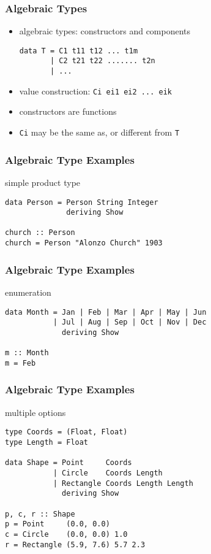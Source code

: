 \documentclass[dvipsnames]{beamer}
\theoremstyle{plain}
\begin{document}
\begin{frame}[fragile]
  \frametitle{Algebraic Types}

  \begin{itemize}
    \item \alert{algebraic types}: constructors and components
    \begin{lstlisting}[style=syntax]
data T = C1 t11 t12 ... t1m
       | C2 t21 t22 ....... t2n
       | ...
    \end{lstlisting}
    \item value construction: \lstinline|Ci ei1 ei2 ... eik|
    \item constructors are functions
    \item \lstinline|Ci| may be the same as, or different from \lstinline|T|
  \end{itemize}
\end{frame}

\begin{frame}[fragile]
  \frametitle{Algebraic Type Examples}

  \begin{exampleblock}{simple product type}
    \begin{lstlisting}
data Person = Person String Integer
              deriving Show

church :: Person
church = Person "Alonzo Church" 1903
    \end{lstlisting}
  \end{exampleblock}
\end{frame}

\begin{frame}[fragile]
  \frametitle{Algebraic Type Examples}

  \begin{exampleblock}{enumeration}
    \begin{lstlisting}
data Month = Jan | Feb | Mar | Apr | May | Jun
           | Jul | Aug | Sep | Oct | Nov | Dec
             deriving Show

m :: Month
m = Feb
    \end{lstlisting}
  \end{exampleblock}
\end{frame}

\begin{frame}[fragile]
  \frametitle{Algebraic Type Examples}

  \begin{exampleblock}{multiple options}
    \begin{lstlisting}
type Coords = (Float, Float)
type Length = Float

data Shape = Point     Coords
           | Circle    Coords Length
           | Rectangle Coords Length Length
             deriving Show

p, c, r :: Shape
p = Point     (0.0, 0.0)
c = Circle    (0.0, 0.0) 1.0
r = Rectangle (5.9, 7.6) 5.7 2.3
    \end{lstlisting}
  \end{exampleblock}
\end{frame}
\end{document}
